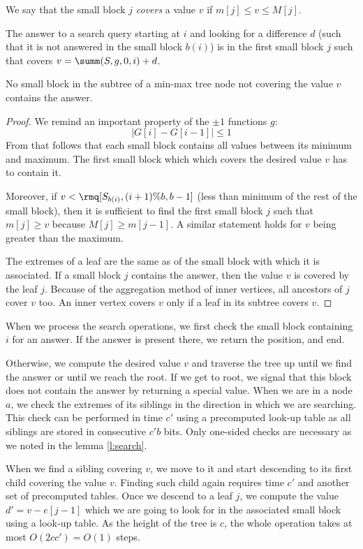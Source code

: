 We say that the small block $j$ \emph{covers} a value $v$ if $m[j] \le v \le M[j]$.

\begin{lemma}\label{l:search}
	The answer to a search query starting at $i$ and looking for a difference $d$ (such that it is not answered in the small block $b(i)$) is in the first small block $j$ such that covers $v = \summ(S, g, 0, i) + d$.
	
	No small block in the subtree of a min-max tree node not covering the value $v$ contains the answer.
\end{lemma}
\begin{proof}
	We remind an important property of the $\pm 1$ functions $g$: 
	$$| G[i] - G[i-1] | \le 1$$
	From that follows that each small block contains all values between its minimum and maximum.
	The first small block which which covers the desired value $v$ has to contain it.
	
	Moreover, if $v < \rmq[S_{b(i)}, (i + 1) \% b, b - 1]$ (less than minimum of the rest of the small block), then it is sufficient to find the first small block $j$ such that $m[j] \ge v$ because $M[j] \ge m[j-1]$.
	A similar statement holds for $v$ being greater than the maximum.
	
	The extremes of a leaf are the same as of the small block with which it is associated.
	If a small block $j$ contains the answer, then the value $v$ is covered by the leaf $j$.
	Because of the aggregation method of inner vertices, all ancestors of $j$ cover $v$ too.
	An inner vertex covers $v$ only if a leaf in its subtree covers $v$.
\end{proof}

When we process the search operations, we first check the small block containing $i$ for an answer.
If the answer is present there, we return the position, and end.

Otherwise, we compute the desired value $v$ and traverse the tree up until we find the answer or until we reach the root.
If we get to root, we signal that this block does not contain the answer by returning a special value.
When we are in a node $a$, we check the extremes of its siblings in the direction in which we are searching.
This check can be performed in time $c'$ using a precomputed look-up table as all siblings are stored in consecutive $c' b$ bits.
Only one-sided checks are necessary as we noted in the lemma \ref{l:search}.

When we find a sibling covering $v$, we move to it and start descending to its first child covering the value $v$.
Finding such child again requires time $c'$ and another set of precomputed tables.
Once we descend to a leaf $j$, we compute the value $d' = v - e[j - 1]$ which we are going to look for in the associated small block using a look-up table. 
As the height of the tree is $c$, the whole operation takes at most $O(2 c c') = O(1)$ steps.

